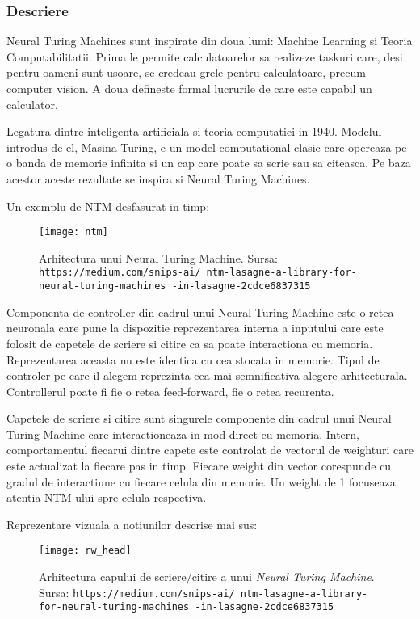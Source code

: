 \documentclass[12pt]{article}
\begin{document}
\subsubsection{Descriere}

Neural Turing Machines sunt inspirate din doua lumi: Machine Learning si Teoria Computabilitatii. Prima le permite calculatoarelor sa realizeze taskuri care, desi pentru oameni sunt usoare, se credeau grele pentru calculatoare, precum computer vision. A doua defineste formal lucrurile de care este capabil un calculator. 

Legatura dintre inteligenta artificiala si teoria computatiei in 1940. Modelul introdus de el, Masina Turing, e un model computational clasic care opereaza pe o banda de memorie infinita si un cap care poate sa scrie sau sa citeasca. Pe baza acestor aceste rezultate se inspira si Neural Turing Machines.

Un exemplu de NTM desfasurat in timp:


\begin{figure}
\centering
\texttt{[image: ntm]}
\\
\caption{Arhitectura unui Neural Turing Machine. Sursa: \texttt{https://medium.com/snips-ai/
ntm-lasagne-a-library-for-neural-turing-machines
-in-lasagne-2cdce6837315}}
\end{figure}

Componenta de controller din cadrul unui Neural Turing Machine este o retea neuronala care pune la dispozitie reprezentarea interna a inputului care este folosit de capetele de scriere si citire ca sa poate interactiona cu memoria. Reprezentarea aceasta nu este identica cu cea stocata in memorie. Tipul de controler pe care il alegem reprezinta cea mai semnificativa alegere arhitecturala. Controllerul poate fi fie o retea feed-forward, fie o retea recurenta.

Capetele de scriere si citire sunt singurele componente din cadrul unui Neural Turing Machine care interactioneaza in mod direct cu memoria. Intern, comportamentul fiecarui dintre capete este controlat de vectorul de weighturi care este actualizat la fiecare pas in timp. Fiecare weight din vector corespunde cu gradul de interactiune cu fiecare celula din memorie. Un weight de 1 focuseaza atentia NTM-ului spre celula respectiva.

Reprezentare vizuala a notiunilor descrise mai sus:

\begin{figure}
\centering
\texttt{[image: rw\_head]}
\\
\caption{Arhitectura capului de scriere/citire a unui \textit{Neural Turing Machine}. Sursa: \texttt{https://medium.com/snips-ai/
ntm-lasagne-a-library-for-neural-turing-machines
-in-lasagne-2cdce6837315}}
\end{figure}
\end{document}
